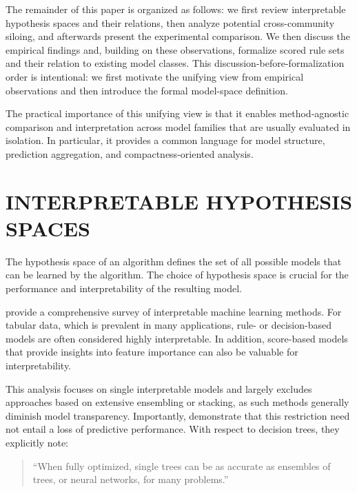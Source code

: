 \documentclass[a4paper,twoside]{article}
\begin{document}
The remainder of this paper is organized as follows: we first review interpretable hypothesis spaces and their relations, then analyze potential cross-community siloing, and afterwards present the experimental comparison. We then discuss the empirical findings and, building on these observations, formalize scored rule sets and their relation to existing model classes. This discussion-before-formalization order is intentional: we first motivate the unifying view from empirical observations and then introduce the formal model-space definition.

The practical importance of this unifying view is that it enables method-agnostic comparison and interpretation across model families that are usually evaluated in isolation. In particular, it provides a common language for model structure, prediction aggregation, and compactness-oriented analysis.


\section{\uppercase{Interpretable Hypothesis Spaces}}

The hypothesis space of an algorithm defines the set of all possible models that can be learned by the algorithm. The choice of hypothesis space is crucial for the performance and interpretability of the resulting model. 

\citet{RudinEtAlSurvey2022} provide a comprehensive survey of interpretable machine learning methods. For tabular data, which is prevalent in many applications, rule- or decision-based models are often considered highly interpretable. In addition, score-based models that provide insights into feature importance can also be valuable for interpretability. %

This analysis focuses on single interpretable models and largely excludes approaches based on extensive ensembling or stacking, as such methods generally diminish model transparency. Importantly, \citet{RudinEtAlSurvey2022} demonstrate that this restriction need not entail a loss of predictive performance. With respect to decision trees, they explicitly note:

\begin{quote}
  ``When fully optimized, single trees can be as accurate as ensembles of trees, or neural networks, for many problems.''
\end{quote}
\end{document}
